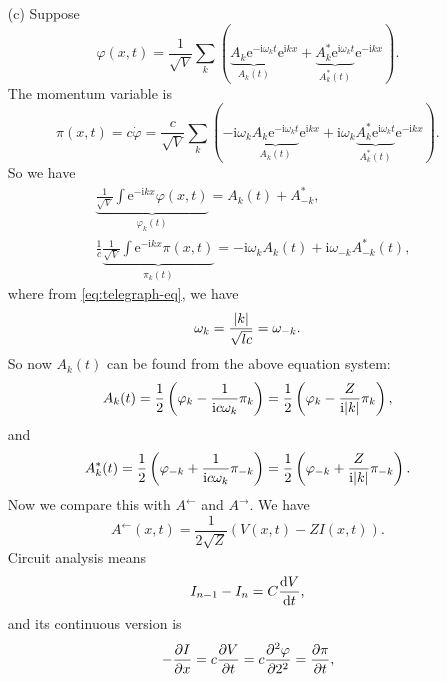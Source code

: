 \documentclass[hyperref, a4paper]{article}
\newcommand*{\ii}{\mathrm{i}}
\newcommand*{\ee}{\mathrm{e}}
\begin{document}
\begin{itemize}
\item[(c)] Suppose 
\begin{equation}
    \varphi(x, t) = \frac{1}{\sqrt{V}} \sum_k 
    (\underbrace{A_k \ee^{- \ii \omega_k t}}_{A_k(t)} \ee^{\ii k x}
    + \underbrace{A_k^* \ee^{\ii \omega_k t}}_{A^*_k(t)} \ee^{- \ii k x}).
\end{equation}
The momentum variable is 
\begin{equation}
    \pi(x, t) = c \dot{\varphi} 
    = \frac{c}{\sqrt{V}} \sum_k 
    (- \ii \omega_k \underbrace{A_k \ee^{- \ii \omega_k t}}_{A_k(t)} \ee^{\ii k x}
    + \ii \omega_k \underbrace{A_k^* \ee^{\ii \omega_k t}}_{A^*_k(t)} \ee^{- \ii k x}).
\end{equation}
So we have 
\[
    \begin{aligned}
        &\underbrace{\frac{1}{\sqrt{V}} \int \ee^{- \ii k x} \varphi(x, t)}_{\varphi_k(t)}
        = A_k(t) + A^*_{-k} , \\
        &\frac{1}{c} \underbrace{\frac{1}{\sqrt{V}} \int \ee^{- \ii k x} \pi(x, t)}_{\pi_k(t)}
        = - \ii \omega_k A_k(t) + \ii \omega_{-k} A_{-k}^*(t),
    \end{aligned}
\] 
where from \eqref{eq:telegraph-eq}, we have 
\begin{equation}
    \omega_k = \frac{\abs{k}}{\sqrt{lc}} = \omega_{-k}.
\end{equation}
So now $A_k(t)$ can be found from the above equation system:
\begin{equation}
    A_k(t) = \frac{1}{2} \left( \varphi_k - \frac{1}{\ii c \omega_k} \pi_k \right)
    = \frac{1}{2} \left( \varphi_k - \frac{Z}{\ii \abs{k}} \pi_k \right),
\end{equation}
and 
\begin{equation}
    A_k^*(t) = \frac{1}{2} \left( \varphi_{-k} + \frac{1}{\ii c \omega_k} \pi_{-k} \right)
    = \frac{1}{2} \left( \varphi_{-k} + \frac{Z}{\ii \abs{k}} \pi_{-k} \right).
\end{equation}
Now we compare this with $A^\leftarrow$ and $A^\rightarrow$.
We have 
\begin{equation}
    A^\leftarrow(x, t) = \frac{1}{2 \sqrt{Z}} (V(x, t) - Z I(x, t)).
\end{equation}
Circuit analysis means 
\begin{equation}
    I_{n-1} - I_n = C \dv{V}{t},
\end{equation}
and its continuous version is 
\begin{equation}
    - \pdv{I}{x} = c \pdv{V}{t} = c \pdv[2]{\varphi}{2} = \pdv{\pi}{t}, 

\end{equation}
\end{itemize}
\end{document}
